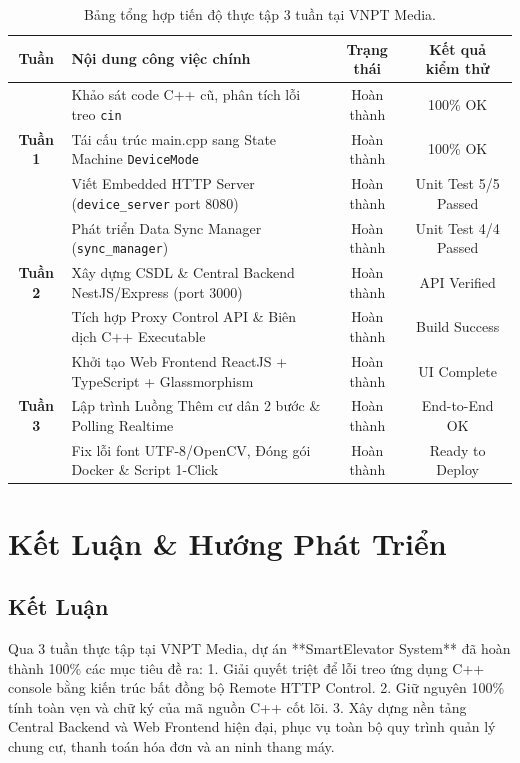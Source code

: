 \documentclass[12pt,a4paper]{article}
\begin{document}
\begin{table}[H]
\centering
\small
{}\selectfont
{}
\begin{tabularx}{\textwidth}{c X c c}
\toprule
\textbf{Tuần} & \textbf{Nội dung công việc chính} & \textbf{Trạng thái} & \textbf{Kết quả kiểm thử} \\
\toprule
\multirow{3}{*}{\textbf{Tuần 1}} 
& Khảo sát code C++ cũ, phân tích lỗi treo \texttt{cin} & Hoàn thành & 100\% OK \\
& Tái cấu trúc main.cpp sang State Machine \texttt{DeviceMode} & Hoàn thành & 100\% OK \\
& Viết Embedded HTTP Server (\texttt{device\_server} port 8080) & Hoàn thành & Unit Test 5/5 Passed \\
\midrule
\multirow{3}{*}{\textbf{Tuần 2}} 
& Phát triển Data Sync Manager (\texttt{sync\_manager}) & Hoàn thành & Unit Test 4/4 Passed \\
& Xây dựng CSDL \& Central Backend NestJS/Express (port 3000) & Hoàn thành & API Verified \\
& Tích hợp Proxy Control API \& Biên dịch C++ Executable & Hoàn thành & Build Success \\
\midrule
\multirow{3}{*}{\textbf{Tuần 3}} 
& Khởi tạo Web Frontend ReactJS + TypeScript + Glassmorphism & Hoàn thành & UI Complete \\
& Lập trình Luồng Thêm cư dân 2 bước \& Polling Realtime & Hoàn thành & End-to-End OK \\
& Fix lỗi font UTF-8/OpenCV, Đóng gói Docker \& Script 1-Click & Hoàn thành & Ready to Deploy \\
\bottomrule
\end{tabularx}
\caption{Bảng tổng hợp tiến độ thực tập 3 tuần tại VNPT Media.}
\end{table}

\newpage

\section{Kết Luận \& Hướng Phát Triển}

\subsection{Kết Luận}
Qua 3 tuần thực tập tại VNPT Media, dự án **SmartElevator System** đã hoàn thành 100\% các mục tiêu đề ra:
1. Giải quyết triệt để lỗi treo ứng dụng C++ console bằng kiến trúc bất đồng bộ Remote HTTP Control.
2. Giữ nguyên 100\% tính toàn vẹn và chữ ký của mã nguồn C++ cốt lõi.
3. Xây dựng nền tảng Central Backend và Web Frontend hiện đại, phục vụ toàn bộ quy trình quản lý chung cư, thanh toán hóa đơn và an ninh thang máy.
\end{document}
